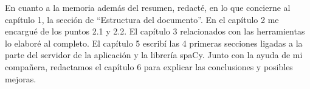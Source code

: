En cuanto a la memoria además del resumen, redacté, en lo que concierne al capítulo 1, la sección de ``Estructura del documento''. En el capítulo 2  me encargué de los puntos 2.1 y 2.2. El capítulo 3 relacionados con las herramientas lo elaboré al completo. El capítulo 5 escribí las 4 primeras secciones ligadas a la parte del servidor de la aplicación y la librería spaCy. Junto con la ayuda de mi compañera, redactamos el capítulo 6 para explicar las conclusiones y posibles mejoras.